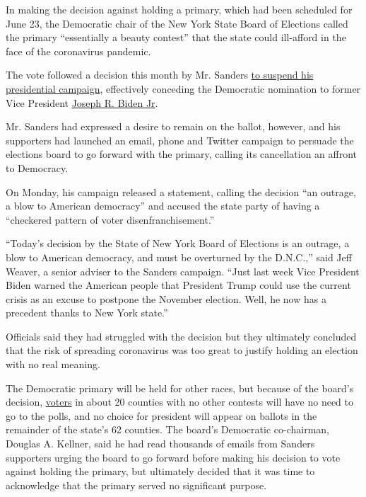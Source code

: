 In making the decision against holding a primary, which had been
scheduled for June 23, the Democratic chair of the New York State Board
of Elections called the primary ``essentially a beauty contest'' that
the state could ill-afford in the face of the coronavirus pandemic.

The vote followed a decision this month by Mr. Sanders
\href{https://slack-redir.net/link?url=https\%3A\%2F\%2Fwww.nytimes.com\%2F2020\%2F04\%2F08\%2Fus\%2Fpolitics\%2Fbernie-sanders-drops-out.html}{to
suspend his presidential campaign}, effectively conceding the Democratic
nomination to former Vice President
\href{https://slack-redir.net/link?url=https\%3A\%2F\%2Fwww.nytimes.com\%2Finteractive\%2F2020\%2Fus\%2Felections\%2Fjoe-biden.html}{Joseph
R. Biden Jr}.

Mr. Sanders had expressed a desire to remain on the ballot, however, and
his supporters had launched an email, phone and Twitter campaign to
persuade the elections board to go forward with the primary, calling its
cancellation an affront to Democracy.

On Monday, his campaign released a statement, calling the decision ``an
outrage, a blow to American democracy'' and accused the state party of
having a ``checkered pattern of voter disenfranchisement.''

``Today's decision by the State of New York Board of Elections is an
outrage, a blow to American democracy, and must be overturned by the
D.N.C.,'' said Jeff Weaver, a senior adviser to the Sanders campaign.
``Just last week Vice President Biden warned the American people that
President Trump could use the current crisis as an excuse to postpone
the November election. Well, he now has a precedent thanks to New York
state.''

Officials said they had struggled with the decision but they ultimately
concluded that the risk of spreading coronavirus was too great to
justify holding an election with no real meaning.

The Democratic primary will be held for other races, but because of the
board's decision,
\href{https://www.nytimes.com/2020/05/29/us/politics/trump-coronavirus-polls.html}{voters}
in about 20 counties with no other contests will have no need to go to
the polls, and no choice for president will appear on ballots in the
remainder of the state's 62 counties. The board's Democratic
co-chairman, Douglas A. Kellner, said he had read thousands of emails
from Sanders supporters urging the board to go forward before making his
decision to vote against holding the primary, but ultimately decided
that it was time to acknowledge that the primary served no significant
purpose.

